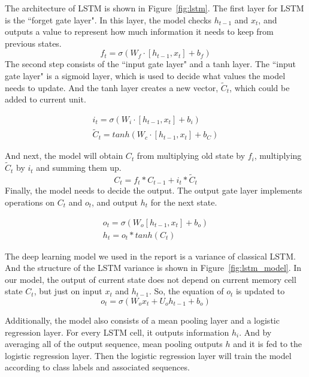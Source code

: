 The architecture of LSTM is shown in Figure~\ref{fig:lstm}. The first layer for LSTM is the ``forget gate layer". In this layer, the model checks $h_{t-1}$ and $x_t$, and outputs a value to represent how much information it needs to keep from previous states. 
$$f_t = \sigma (W_f \cdot [h_{t-1}, x_t] + b_f)$$
The second step consists of the ``input gate layer" and a tanh layer. The ``input gate layer" is a sigmoid layer, which is used to decide what values the model needs to update. And the tanh layer creates a new vector, $\tilde{C}_t$, which could be added to current unit.
 
\begin{align*}
i_t = \sigma (W_i \cdot [h_{t-1}, x_t] + b_i) \\
\tilde{C}_t = tanh(W_c \cdot [h_{t-1}, x_t] + b_C)
\end{align*}

And next, the model will obtain $C_t$ from multiplying old state by $f_i$, multiplying $\tilde{C}_t$ by $i_t$ and summing them up. 
$$C_t = f_t * C_{t-1} + i_t * \tilde{C}_t$$
Finally, the model needs to decide the output. The output gate layer implements operations on $C_t$ and $o_t$, and output $h_t$ for the next state.

\begin{align*}
o_t = \sigma (W_o [h_{t-1}, x_t] + b_o) \\
h_t = o_t * tanh(C_t)
\end{align*}

The deep learning model we used in the report is a variance of classical LSTM. And the structure of the LSTM variance is shown in Figure~\ref{fig:lstm_model}. In our model, the output of current state does not depend on current memory cell state $C_t$, but just on input $x_t$ and $h_{t-1}$. So, the equation of $o_t$ is updated to
$$
o_t = \sigma (W_o x_t + U_o h_{t-1} + b_o)
$$

Additionally, the model also consists of a mean pooling layer and a logistic regression layer. For every LSTM cell, it outputs information $h_i$. And by averaging all of the output sequence, mean pooling outputs $h$ and it is fed to the logistic regression layer. Then the logistic regression layer will train the model according to class labels and associated sequences.

